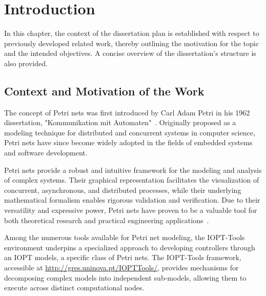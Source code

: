 
%

\chapter{Introduction}
\label{cha:introduction}


\epigraphfontsize{\small\itshape}
\setlength\epigraphwidth{12.5cm}
\setlength\epigraphrule{0pt}

In this chapter, the context of the dissertation plan is established with respect to previously developed related work, thereby outlining the motivation for the topic and the intended objectives. A concise overview of the dissertation’s structure is also provided.

\section{Context and Motivation of the Work}
\label{sec:context_and_motivation_of_the_work}


The concept of Petri nets was first introduced by Carl Adam Petri in his 1962 dissertation, "Kommunikation mit Automaten"~\cite{petri1962}. Originally proposed as a modeling technique for distributed and concurrent systems in computer science, Petri nets have since become widely adopted in the fields of embedded systems and software development.

Petri nets provide a robust and intuitive framework for the modeling and analysis of complex systems. Their graphical representation facilitates the visualization of concurrent, asynchronous, and distributed processes, while their underlying mathematical formalism enables rigorous validation and verification. Due to their versatility and expressive power, Petri nets have proven to be a valuable tool for both theoretical research and practical engineering applications~\cite{murata}.

Among the numerous tools available for Petri net modeling, the IOPT-Tools environment underpins a specialized approach to developing controllers through an IOPT models, a specific class of Petri nets. The IOPT-Tools framework, accessible at \url{http://gres.uninova.pt/IOPTTools/}, provides mechanisms for decomposing complex models into independent sub-models, allowing them to execute across distinct computational nodes.

